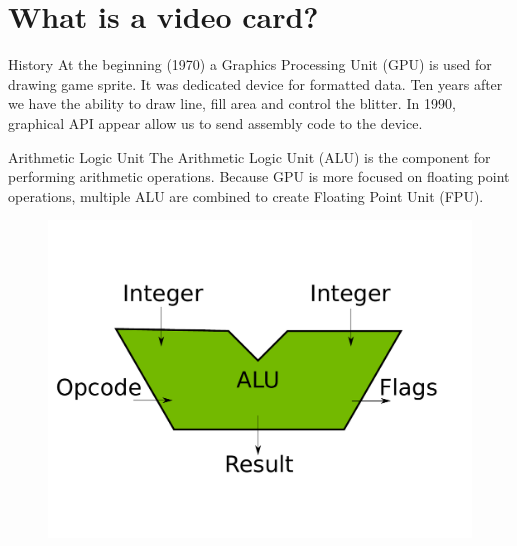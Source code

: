 \documentclass{beamer}
\begin{document}
\section{What is a video card?}
\begin{frame}{History}
	At the beginning (1970) a Graphics Processing Unit (GPU) is used for drawing game sprite. It was dedicated device for formatted data. Ten years after we have the ability to draw line, fill area and control the blitter. In 1990, graphical API appear allow us to send assembly code to the device.
\end{frame}

\begin{frame}{Arithmetic Logic Unit}
	The Arithmetic Logic Unit (ALU) is the component for performing arithmetic operations. Because GPU is more focused on floating point operations, multiple ALU are combined to create Floating Point Unit (FPU).
	\begin{figure}
		\includegraphics[scale=0.3]{figures/ALU.pdf}
	\end{figure}
\end{frame}
\end{document}
